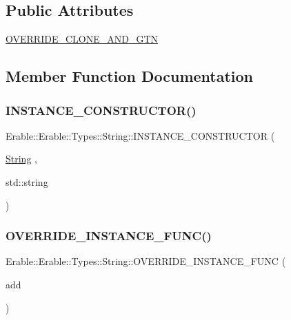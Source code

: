 \subsection*{Public Attributes}
\begin{DoxyCompactItemize}
\item 
\mbox{\hyperlink{class_erable_1_1_erable_1_1_types_1_1_string_a46c86deb6cdb4ac113290996cd6b6f72}{O\+V\+E\+R\+R\+I\+D\+E\+\_\+\+C\+L\+O\+N\+E\+\_\+\+A\+N\+D\+\_\+\+G\+TN}}
\end{DoxyCompactItemize}


\subsection{Member Function Documentation}
\mbox{\label{class_erable_1_1_erable_1_1_types_1_1_string_a6043c691c87eed3985cb5249715c03ae}} 
\subsubsection{\texorpdfstring{INSTANCE\_CONSTRUCTOR()}{INSTANCE\_CONSTRUCTOR()}}
{\footnotesize\ttfamily Erable\+::\+Erable\+::\+Types\+::\+String\+::\+I\+N\+S\+T\+A\+N\+C\+E\+\_\+\+C\+O\+N\+S\+T\+R\+U\+C\+T\+OR (\begin{DoxyParamCaption}\item[{\mbox{\hyperlink{class_erable_1_1_erable_1_1_types_1_1_string}{String}}}]{,  }\item[{std\+::string}]{ }\end{DoxyParamCaption})}

\mbox{\label{class_erable_1_1_erable_1_1_types_1_1_string_a4fcaccd39704712c5c12b0ac8f3034a8}} 
\subsubsection{\texorpdfstring{OVERRIDE\_INSTANCE\_FUNC()}{OVERRIDE\_INSTANCE\_FUNC()}\hspace{0.1cm}{\footnotesize\ttfamily [1/6]}}
{\footnotesize\ttfamily Erable\+::\+Erable\+::\+Types\+::\+String\+::\+O\+V\+E\+R\+R\+I\+D\+E\+\_\+\+I\+N\+S\+T\+A\+N\+C\+E\+\_\+\+F\+U\+NC (\begin{DoxyParamCaption}\item[{add}]{ }\end{DoxyParamCaption})}

